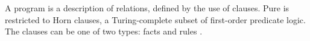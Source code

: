 \documentclass[thesis-solanki.tex]{subfiles}
\begin{document}
A  program is a description of relations, defined by the use of clauses. Pure  is restricted to Horn 
clauses, a Turing-complete subset of first-order predicate logic. The clauses can be one of two types: facts and rules 
\cite{website:prologintroumiami}.

\begin{comment}
In \progLang{Prolog}
 all data objects are called terms.\endnote{%
   Fix.
}
 Atomic terms
 come in two forms: atoms and integers.
 Atoms (this is a misnomer,\endnote{%
   Fix
}
 as in logic predicates are called atoms, and atoms are called constants. However, we'll stick to the 
 \progLang{Prolog}\endnote{%
   Fix.
}
 convention.)
consist of
strings of alphanumerics and ``\texttt{\_}'', starting with a lower case alphabetic.
Strings enclosed in 'single quotes'\endnote{%
  What?
}
Integers are numeric.
Example
\par
\begin{verbatim}
geoff
'the cat and the rat'
'ABCD'
123
\end{verbatim}
\end{comment}
\end{document}
